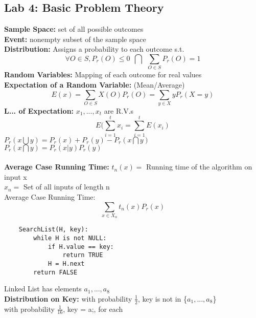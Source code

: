 \documentclass{article}
\begin{document}
	\subsection{Lab 4: Basic Problem Theory}
	\textbf{Sample Space: }set of all possible outcomes\\
	\textbf{Event: }nonempty subset of the sample space\\
	\textbf{Distribution: }Assigns a probability to each outcome s.t. $$\forall O\in S, P_r (O) \le 0 ~~\bigcap~~ \sum_{O\in S} P_r (O) = 1$$
	\textbf{Random Variables: }Mapping of each outcome for real values\\
	\textbf{Expectation of a Random Variable: }(Mean/Average) $$E(x)=\sum_{O\in S} X(O) P_r(O) = \sum_{y\in X} yP_r(X=y)$$
	\textbf{L... of Expectation: } $x_1,...,x_t$ are R.V.s $$E(\sum_{i=1}^{t} x_i = \sum_{i=1}^{t} E(x_i)$$
	$P_r(x\bigcup y) = P_r(x) + P_r(y) - P_r(x\bigcap y)$\\
	$P_r(x\bigcap y) = P_r(x|y)P_r(y)$\\\\
	\textbf{Average Case Running Time: }$t_n(x) =$ Running time of the algorithm on input x\\
	$x_n=$ Set of all inputs of length n\\
	Average Case Running Time: $$\sum_{x\in X_n} t_n(x)P_r(x)$$
	\begin{lstlisting}
	SearchList(H, key):
		while H is not NULL:
			if H.value == key:
				return TRUE
			H = H.next
		return FALSE
	\end{lstlisting}
	Linked List has elements $a_1,...,a_8$\\
	\textbf{Distribution on Key: }with probability $\frac{1}{2}$, key is not in \{$a_1,...,a_8$\}\\
	with probability $\frac{1}{16}$, key = a;, for each\\
	 
\end{document}
